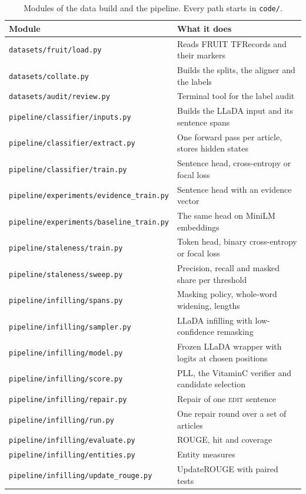 \documentclass[]{paper}
\newcommand{\edit}{\textsc{edit}}
\begin{document}
\begin{table}[H]
\caption{Modules of the data build and the pipeline. Every path starts in \texttt{code/}.}
\label{tab:modules}
\footnotesize
\begin{tabular*}{\linewidth}{@{}l@{\extracolsep{\fill}}l@{}}
\toprule
Module & What it does \\
\midrule
\texttt{datasets/fruit/load.py} & Reads FRUIT TFRecords and their markers \\
\texttt{datasets/collate.py} & Builds the splits, the aligner and the labels \\
\texttt{datasets/audit/review.py} & Terminal tool for the label audit \\
\texttt{pipeline/classifier/inputs.py} & Builds the LLaDA input and its sentence spans \\
\texttt{pipeline/classifier/extract.py} & One forward pass per article, stores hidden states \\
\texttt{pipeline/classifier/train.py} & Sentence head, cross-entropy or focal loss \\
\texttt{pipeline/experiments/evidence\_train.py} & Sentence head with an evidence vector \\
\texttt{pipeline/experiments/baseline\_train.py} & The same head on MiniLM embeddings \\
\texttt{pipeline/staleness/train.py} & Token head, binary cross-entropy or focal loss \\
\texttt{pipeline/staleness/sweep.py} & Precision, recall and masked share per threshold \\
\texttt{pipeline/infilling/spans.py} & Masking policy, whole-word widening, lengths \\
\texttt{pipeline/infilling/sampler.py} & LLaDA infilling with low-confidence remasking \\
\texttt{pipeline/infilling/model.py} & Frozen LLaDA wrapper with logits at chosen positions \\
\texttt{pipeline/infilling/score.py} & PLL, the VitaminC verifier and candidate selection \\
\texttt{pipeline/infilling/repair.py} & Repair of one \edit{} sentence \\
\texttt{pipeline/infilling/run.py} & One repair round over a set of articles \\
\texttt{pipeline/infilling/evaluate.py} & ROUGE, hit and coverage \\
\texttt{pipeline/infilling/entities.py} & Entity measures \\
\texttt{pipeline/infilling/update\_rouge.py} & UpdateROUGE with paired tests \\

\end{tabular*}
\end{table}
\end{document}

